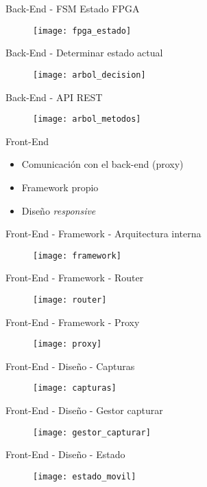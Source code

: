 \begin{frame}{Back-End - FSM Estado FPGA}
  \begin{figure}
    \texttt{[image: fpga\_estado]}
  \end{figure}
\end{frame}

\begin{frame}{Back-End - Determinar estado actual}
  \begin{figure}
    \texttt{[image: arbol\_decision]}
  \end{figure}
\end{frame}

\begin{frame}{Back-End - API REST}
  \begin{figure}
    \texttt{[image: arbol\_metodos]}
  \end{figure}
\end{frame}

\begin{frame}{Front-End}
 \begin{itemize}[<alert@+>]
    \item Comunicación con el back-end (proxy)
    \item Framework propio
    \item Diseño \textit{responsive}
  \end{itemize}
\end{frame}

\begin{frame}{Front-End - Framework - Arquitectura interna}
  \begin{figure}
    \texttt{[image: framework]}
  \end{figure}
\end{frame}

\begin{frame}{Front-End - Framework - Router}
  \begin{figure}
    \texttt{[image: router]}
  \end{figure}
\end{frame}

\begin{frame}{Front-End - Framework - Proxy}
  \begin{figure}
    \texttt{[image: proxy]}
  \end{figure}
\end{frame}

\begin{frame}{Front-End - Diseño - Capturas}
  \begin{figure}
    \texttt{[image: capturas]}
  \end{figure}
\end{frame}

\begin{frame}{Front-End - Diseño - Gestor capturar}
  \begin{figure}
    \texttt{[image: gestor\_capturar]}
  \end{figure}
\end{frame}

\begin{frame}{Front-End - Diseño - Estado}
  \begin{figure}
    \texttt{[image: estado\_movil]}
  \end{figure}
\end{frame}
